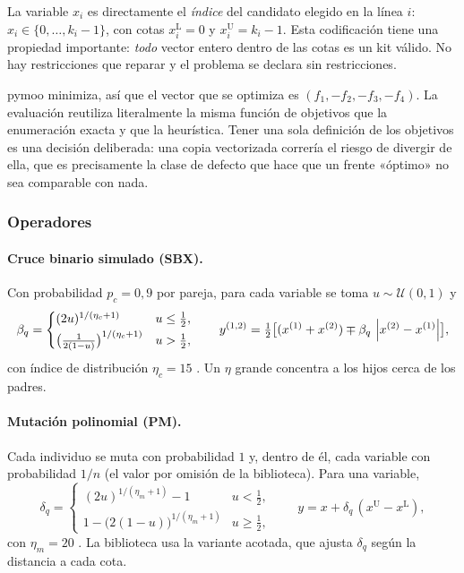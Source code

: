 La variable $x_i$ es directamente el \emph{índice} del candidato elegido en la
línea $i$: $x_i\in\{0,\dots,k_i-1\}$, con cotas $x_i^{\mathrm{L}}=0$ y
$x_i^{\mathrm{U}}=k_i-1$. Esta codificación tiene una propiedad importante:
\emph{todo} vector entero dentro de las cotas es un kit válido. No hay
restricciones que reparar y el problema se declara sin restricciones.

pymoo minimiza, así que el vector que se optimiza es
$(f_1,-f_2,-f_3,-f_4)$. La evaluación reutiliza literalmente la misma función
de objetivos que la enumeración exacta y que la heurística. Tener una sola
definición de los objetivos es una decisión deliberada: una copia vectorizada
correría el riesgo de divergir de ella, que es precisamente la clase de
defecto que hace que un frente «óptimo» no sea comparable con nada.

\subsubsection{Operadores}

\paragraph{Cruce binario simulado (SBX).} Con probabilidad $p_c=0{,}9$ por
pareja, para cada variable se toma $u\sim\mathcal{U}(0,1)$ y
\[
  \beta_q=\begin{cases}(2u)^{1/(\eta_c+1)} & u\leq\tfrac12,\\[2pt]
  \bigl(\tfrac{1}{2(1-u)}\bigr)^{1/(\eta_c+1)} & u>\tfrac12,\end{cases}
  \qquad
  y^{(1,2)}=\tfrac12\bigl[(x^{(1)}+x^{(2)})\mp\beta_q\,\left\lvert x^{(2)}-x^{(1)} \right\rvert\bigr],
\]
con índice de distribución $\eta_c=15$ \cite{deb1995sbx}. Un $\eta$ grande
concentra a los hijos cerca de los padres.

\paragraph{Mutación polinomial (PM).} Cada individuo se muta con probabilidad
$1$ y, dentro de él, cada variable con probabilidad $1/n$ (el valor por
omisión de la biblioteca). Para una variable,
\[
  \delta_q=\begin{cases}(2u)^{1/(\eta_m+1)}-1 & u<\tfrac12,\\
  1-\bigl(2(1-u)\bigr)^{1/(\eta_m+1)} & u\geq\tfrac12,\end{cases}
  \qquad y=x+\delta_q\,(x^{\mathrm{U}}-x^{\mathrm{L}}),
\]
con $\eta_m=20$ \cite{deb1996pm}. La biblioteca usa la variante acotada, que
ajusta $\delta_q$ según la distancia a cada cota.

